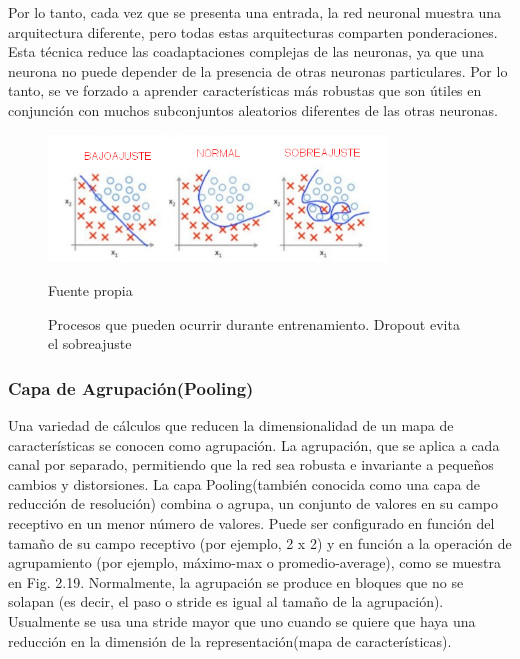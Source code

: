 		\vskip 0.4cm 
		Por lo tanto, cada vez que se presenta una entrada, la red neuronal muestra una arquitectura diferente, pero todas estas arquitecturas comparten ponderaciones. Esta técnica reduce las coadaptaciones complejas de las neuronas, ya que una neurona no puede depender de la presencia de otras neuronas particulares. Por lo tanto, se ve forzado a aprender características más robustas que son útiles en conjunción con muchos subconjuntos aleatorios diferentes de las otras neuronas.
		\begin{figure}[H]
		\begin{center}
		\includegraphics[width=0.8\textwidth]{images/marcoteorico/dropout}
		\end{center}
		\begin{center}
		\caption{\small{Procesos que pueden ocurrir durante entrenamiento. Dropout evita el sobreajuste}}
		\vskip -0.3cm  
		{\small{Fuente propia}}
		\end{center}
		\vspace{-1.5em}
		\end{figure}

		\vskip 0.4cm 
	\subsubsection {Capa de Agrupación(Pooling)}
		\vskip 0.4cm 

		Una variedad de cálculos que reducen la dimensionalidad de un mapa de características se conocen como agrupación. La agrupación, que se aplica a cada canal por separado, permitiendo que la red sea robusta e invariante a pequeños cambios y distorsiones. La capa Pooling(también conocida como una capa de reducción de resolución) combina o agrupa, un conjunto de valores en su campo receptivo en un menor número de valores. Puede ser configurado en función del tamaño de su campo receptivo (por ejemplo, 2 x 2) y en función a la operación de agrupamiento (por ejemplo, máximo-max o promedio-average), como se muestra en Fig. 2.19. Normalmente, la agrupación se produce en bloques que no se solapan (es decir, el paso o stride es igual al tamaño de la agrupación). Usualmente se usa una stride mayor que uno cuando se quiere que haya una reducción en la dimensión de la representación(mapa de características).

